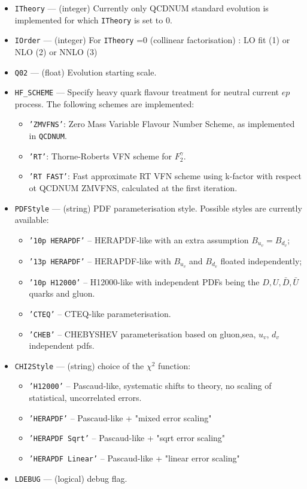 \documentclass[11pt,a4paper]{article}
\begin{document}
\begin{itemize}
  \item {\tt ITheory} --- (integer) Currently only QCDNUM standard evolution
     is implemented for which {\tt ITheory} is set to 0.
  \item {\tt IOrder} --- (integer) For {\tt ITheory} =0 (collinear factorisation) : 
        LO fit (1) or NLO (2) or NNLO (3) 
  \item {\tt Q02} --- (float) Evolution starting scale.
  \item {\tt HF\_SCHEME} --- Specify heavy quark flavour treatment for neutral
 current $ep$ process. The following schemes are implemented: 
    \begin{itemize}
      \item {\tt 'ZMVFNS'}: Zero Mass Variable Flavour Number Scheme, as implemented
 in {\tt QCDNUM}.
      \item {\tt 'RT'}: Thorne-Roberts VFN scheme for $F_2^{\gamma}$. 
      \item {\tt 'RT FAST'}: Fast approximate RT VFN scheme using k-factor 
with respect ot QCDNUM ZMVFNS, calculated at the first iteration.
    \end{itemize}
\item {\tt PDFStyle} --- (string) PDF parameterisation style. Possible styles are currently available:
   \begin{itemize}
  \item{\tt '10p HERAPDF'} -- HERAPDF-like with an extra assumption 
                                 $B_{u_v} = B_{d_v}$;
  \item{\tt '13p HERAPDF'} -- HERAPDF-like with $B_{u_v}$ and $B_{d_v}$ 
                          floated independently;
  \item{\tt '10p H12000'}  -- H12000-like with independent PDFs being the
               $D,U,\bar{D},\bar{U}$ quarks and gluon.
  \item{\tt 'CTEQ'}        -- CTEQ-like parameterisation.
  \item{\tt 'CHEB'}        -- CHEBYSHEV parameterisation based on 
         gluon,sea, $u_{v}$, $d_{v}$ independent pdfs.
 \end{itemize}
\item {\tt CHI2Style}  --- (string) choice of the $\chi^2$ function:
   \begin{itemize}
   \item {\tt 'H12000'} -- Pascaud-like, systematic shifts to theory, no scaling of statistical, uncorrelated errors.
   \item {\tt 'HERAPDF'} -- Pascaud-like + "mixed error scaling"
   \item {\tt 'HERAPDF Sqrt'}   -- Pascaud-like + "sqrt error scaling"
   \item {\tt 'HERAPDF Linear'} -- Pascaud-like + "linear error scaling"
 \end{itemize}
  \item {\tt LDEBUG}  --- (logical) debug flag.
\end{itemize}
\end{document}
